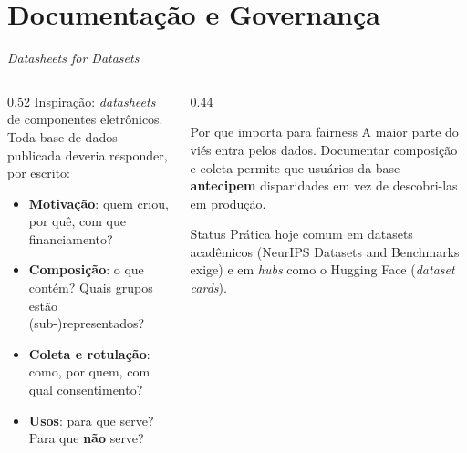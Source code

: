 \documentclass[aspectratio=169,xcolor=dvipsnames]{beamer}
\begin{document}
  \section{Documentação e Governança}

  \begin{frame}{\textit{Datasheets for Datasets}}
    \begin{columns}[T]
      \begin{column}{0.52\textwidth}
        Inspiração: \textit{datasheets} de componentes eletrônicos. Toda base de dados publicada deveria responder, por escrito:
        \begin{itemize}\setlength{\itemsep}{0.2em}
          \item \textbf{Motivação}: quem criou, por quê, com que financiamento?
          \item \textbf{Composição}: o que contém? Quais grupos estão (sub-)representados?
          \item \textbf{Coleta e rotulação}: como, por quem, com qual consentimento?
          \item \textbf{Usos}: para que serve? Para que \textbf{não} serve?
        \end{itemize}
      \end{column}
      \begin{column}{0.44\textwidth}
        \begin{block}{Por que importa para fairness}
          A maior parte do viés entra pelos dados. Documentar composição e coleta permite que usuários da base \textbf{antecipem} disparidades em vez de descobri-las em produção.
        \end{block}
        \begin{alertblock}{Status}
          Prática hoje comum em datasets acadêmicos (NeurIPS Datasets and Benchmarks exige) e em \textit{hubs} como o Hugging Face (\textit{dataset cards}).
        \end{alertblock}
      \end{column}
    \end{columns}
  \end{frame}
\end{document}
